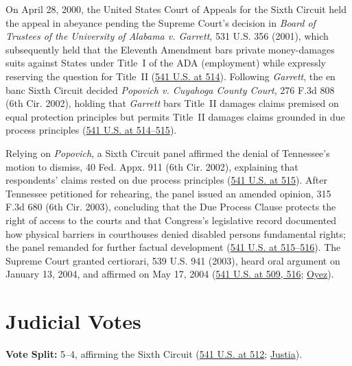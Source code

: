 \documentclass[12pt]{article}
\begin{document}
On April 28, 2000, the United States Court of Appeals for the Sixth Circuit held the appeal in abeyance pending the Supreme Court's decision in \textit{Board of Trustees of the University of Alabama v. Garrett}, 531 U.S. 356 (2001), which subsequently held that the Eleventh Amendment bars private money-damages suits against States under Title~I of the ADA (employment) while expressly reserving the question for Title~II (\href{https://www.law.cornell.edu/supremecourt/text/541/509}{541 U.S. at 514}). Following \textit{Garrett}, the en banc Sixth Circuit decided \textit{Popovich v. Cuyahoga County Court}, 276 F.3d 808 (6th Cir. 2002), holding that \textit{Garrett} bars Title~II damages claims premised on equal protection principles but permits Title~II damages claims grounded in due process principles (\href{https://www.law.cornell.edu/supremecourt/text/541/509}{541 U.S. at 514--515}).

Relying on \textit{Popovich}, a Sixth Circuit panel affirmed the denial of Tennessee's motion to dismiss, 40 Fed. Appx. 911 (6th Cir. 2002), explaining that respondents' claims rested on due process principles (\href{https://www.law.cornell.edu/supremecourt/text/541/509}{541 U.S. at 515}). After Tennessee petitioned for rehearing, the panel issued an amended opinion, 315 F.3d 680 (6th Cir. 2003), concluding that the Due Process Clause protects the right of access to the courts and that Congress's legislative record documented how physical barriers in courthouses denied disabled persons fundamental rights; the panel remanded for further factual development (\href{https://www.law.cornell.edu/supremecourt/text/541/509}{541 U.S. at 515--516}). The Supreme Court granted certiorari, 539 U.S. 941 (2003), heard oral argument on January 13, 2004, and affirmed on May 17, 2004 (\href{https://www.law.cornell.edu/supremecourt/text/541/509}{541 U.S. at 509, 516}; \href{https://www.oyez.org/cases/2003/02-1667}{Oyez}).

\section{Judicial Votes}
\textbf{Vote Split:} 5--4, affirming the Sixth Circuit (\href{https://www.law.cornell.edu/supremecourt/text/541/509}{541 U.S. at 512}; \href{https://supreme.justia.com/cases/federal/us/541/509/}{Justia}).
\end{document}
